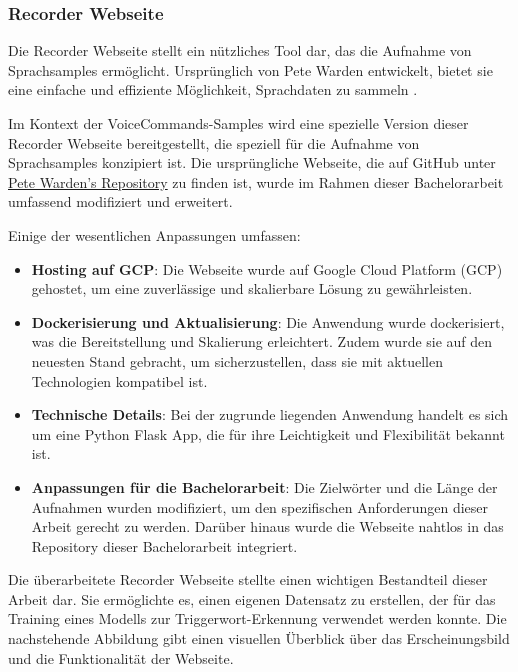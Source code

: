 \documentclass[11pt,a4paper]{article}
\begin{document}
\subsubsection{Recorder Webseite}

Die Recorder Webseite stellt ein nützliches Tool dar, das die Aufnahme von Sprachsamples ermöglicht. 
Ursprünglich von Pete Warden entwickelt, bietet sie eine einfache und effiziente Möglichkeit, 
Sprachdaten zu sammeln \cite{warden2018speech}. 

\noindent \newline
Im Kontext der VoiceCommands-Samples wird eine spezielle Version dieser Recorder Webseite 
bereitgestellt, die speziell für die Aufnahme von Sprachsamples konzipiert ist. Die ursprüngliche 
Webseite, die auf GitHub unter 
\href{https://github.com/petewarden/open-speech-recording/tree/master}{Pete Warden's Repository} zu 
finden ist, wurde im Rahmen dieser Bachelorarbeit umfassend modifiziert und erweitert.

\noindent \newline
Einige der wesentlichen Anpassungen umfassen:

\begin{itemize}
    \item \textbf{Hosting auf GCP}: Die Webseite wurde auf Google Cloud Platform (GCP) gehostet, um 
	eine zuverlässige und skalierbare Lösung zu gewährleisten.
    \item \textbf{Dockerisierung und Aktualisierung}: Die Anwendung wurde dockerisiert, was die 
	Bereitstellung und Skalierung erleichtert. Zudem wurde sie auf den neuesten Stand gebracht, um 
	sicherzustellen, dass sie mit aktuellen Technologien kompatibel ist.
    \item \textbf{Technische Details}: Bei der zugrunde liegenden Anwendung handelt es sich um eine 
	Python Flask App, die für ihre Leichtigkeit und Flexibilität bekannt ist.
    \item \textbf{Anpassungen für die Bachelorarbeit}: Die Zielwörter und die Länge der Aufnahmen 
	wurden modifiziert, um den spezifischen Anforderungen dieser Arbeit gerecht zu werden. Darüber 
	hinaus wurde die Webseite nahtlos in das Repository dieser Bachelorarbeit integriert.
\end{itemize}

\noindent \newline
Die überarbeitete Recorder Webseite stellte einen wichtigen Bestandteil dieser Arbeit dar. Sie
ermöglichte es, einen eigenen Datensatz zu erstellen, der für das Training eines Modells zur
Triggerwort-Erkennung verwendet werden konnte. Die nachstehende Abbildung gibt einen visuellen 
Überblick über das Erscheinungsbild und die Funktionalität der Webseite.
\end{document}
